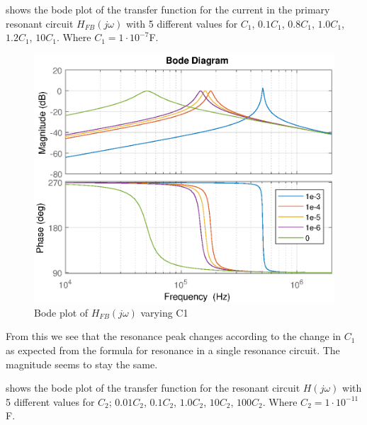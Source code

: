  shows the bode plot of the transfer function for the current in the primary resonant circuit $H_{FB}(j\omega)$ with 5 different values for $C_1$, $0.1C_1$, $0.8C_1$, $1.0C_1$, $1.2C_1$, $10C_1$. Where $C_1 = 1 \cdot 10^{-7}$F.
\begin{figure}[H]
    \centering
    \includegraphics[width=\textwidth]{img/FeedBackBode_C1.eps}
    \caption{Bode plot of $H_{FB}(j\omega)$ varying C1}
    \label{fig:fbbode_c1}
\end{figure}

From this we see that the resonance peak changes according to the change in $C_1$ as expected from the formula for resonance in a single resonance circuit. The magnitude seems to stay the same.

\newpage
{} shows the bode plot of the transfer function for the resonant circuit $H(j\omega)$ with 5 different values for $C_2$; $0.01C_2$, $0.1C_2$, $1.0C_2$, $10C_2$, $100C_2$. Where $C_2 = 1 \cdot 10^{-11}$F.

